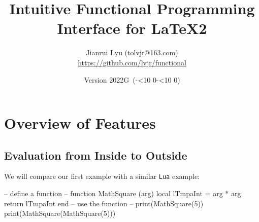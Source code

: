 \documentclass[oneside]{book}
\newcommand*{\myversion}{2022G}
\newcommand*{\mydate}{Version \myversion\ (\the\year-\mylpad\month-\mylpad\day)}
\newcommand*{\mylpad}[1]{\ifnum#1<10 0\the#1\else\the#1\fi}
\begin{document}
\title{\sffamily Intuitive \textcolor{green3}{Functional} Programming Interface for LaTeX2}
\author{Jianrui Lyu (tolvjr@163.com)\\\url{https://github.com/lvjr/functional}}
\date{\mydate\vspace{1cm}\\\myabstract\vspace{10cm}}

\newcommand\myabstract{\parbox{\linewidth}{\hrule\vspace{0.8em}\large
This package provides an intuitive functional programming interface for LaTeX2,
which is an alternative choice to \textsf{expl3} or LuaTeX,
if you want to do programming in LaTeX.
\par\vspace{0.5em}
Although there are functions in LaTeX3 programming layer (\textsf{expl3}),
the evaluation of them is from outside to inside.
With this package, the evaluation of functions is from inside to outside,
which is the same as other programming languages such as \texttt{Lua}.
In this way, it is rather easy to debug code too.
\par\vspace{0.5em}
Note that many paragraphs in this manual are copied from the documentation of \textsf{expl3}.
\par\vspace{0.8em}\hrule}}

{\let\newpage\relax\vspace{-4cm}\maketitle}

\tableofcontents

\chapter{Overview of Features}

\section{Evaluation from Inside to Outside}

We will compare our first example with a similar \verb!Lua! example:

\begin{minipage}{0.55\textwidth}
\begin{codehigh}
\IgnoreSpacesOn
\prgNewFunction {} {
  \intSet {}
  \prgReturn {\expValue \lTmpaInt}
}
\IgnoreSpacesOff
{}
\end{codehigh}
\end{minipage}%
\begin{minipage}{0.45\textwidth}
\begin{code}
-- define a function --
function MathSquare (arg)
  local lTmpaInt = arg * arg
  return lTmpaInt
end
-- use the function --
print(MathSquare(5))
print(MathSquare(MathSquare(5)))
\end{code}
\end{minipage}
\end{document}
